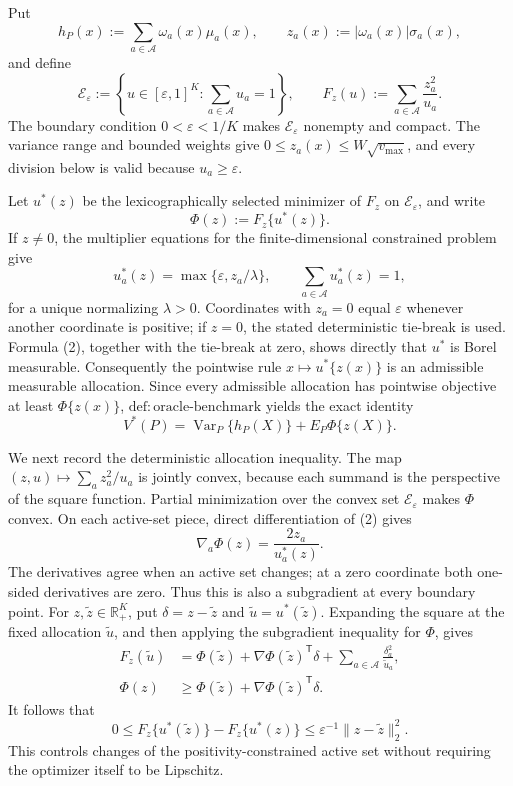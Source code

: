Put
\[
h_P(x):=\sum_{a\in\mathcal A}\omega_a(x)\mu_a(x),
\qquad
z_a(x):=|\omega_a(x)|\sigma_a(x),
\]
and define
\[
\mathcal E_{\varepsilon}:=
\left\{u\in[\varepsilon,1]^K:\sum_{a\in\mathcal A}u_a=1\right\},
\qquad
F_z(u):=\sum_{a\in\mathcal A}\frac{z_a^2}{u_a}.
\tag{1}
\]
The boundary condition \(0<\varepsilon<1/K\) makes \(\mathcal E_{\varepsilon}\) nonempty and compact.  The variance range and bounded weights give
\(0\leq z_a(x)\leq W\sqrt{v_{\max}}\), and every division below is valid because \(u_a\geq\varepsilon\).

Let \(u^*(z)\) be the lexicographically selected minimizer of \(F_z\) on \(\mathcal E_{\varepsilon}\), and write
\[
\Phi(z):=F_z\{u^*(z)\}.
\]
If \(z\neq0\), the multiplier equations for the finite-dimensional constrained problem give
\[
u_a^*(z)=\max\{\varepsilon,z_a/\lambda\},
\qquad
\sum_{a\in\mathcal A}u_a^*(z)=1,
\tag{2}
\]
for a unique normalizing \(\lambda>0\).  Coordinates with \(z_a=0\) equal \(\varepsilon\) whenever another coordinate is positive; if \(z=0\), the stated deterministic tie-break is used.  Formula (2), together with the tie-break at zero, shows directly that \(u^*\) is Borel measurable.  Consequently the pointwise rule \(x\mapsto u^*\{z(x)\}\) is an admissible measurable allocation.  Since every admissible allocation has pointwise objective at least \(\Phi\{z(x)\}\), \(\mathrm{def{:}oracle\text{-}benchmark}\) yields the exact identity
\[
V^*(P)=\operatorname{Var}_P\{h_P(X)\}
+E_P\Phi\{z(X)\}.
\tag{3}
\]

We next record the deterministic allocation inequality.  The map
\((z,u)\mapsto\sum_a z_a^2/u_a\) is jointly convex, because each summand is the perspective of the square function.  Partial minimization over the convex set \(\mathcal E_{\varepsilon}\) makes \(\Phi\) convex.  On each active-set piece, direct differentiation of (2) gives
\[
\nabla_a\Phi(z)=\frac{2z_a}{u_a^*(z)}.
\]
The derivatives agree when an active set changes; at a zero coordinate both one-sided derivatives are zero.  Thus this is also a subgradient at every boundary point.  For \(z,\widetilde z\in\mathbb R_+^K\), put \(\delta=z-\widetilde z\) and \(\widetilde u=u^*(\widetilde z)\).  Expanding the square at the fixed allocation \(\widetilde u\), and then applying the subgradient inequality for \(\Phi\), gives
\[
\begin{aligned}
F_z(\widetilde u)
&=\Phi(\widetilde z)+\nabla\Phi(\widetilde z)^{\mathsf T}\delta
+\sum_{a\in\mathcal A}\frac{\delta_a^2}{\widetilde u_a},\\
\Phi(z)&\geq
\Phi(\widetilde z)+\nabla\Phi(\widetilde z)^{\mathsf T}\delta.
\end{aligned}
\]
It follows that
\[
0\leq F_z\{u^*(\widetilde z)\}-F_z\{u^*(z)\}
\leq\varepsilon^{-1}\|z-\widetilde z\|_2^2.
\tag{4}
\]
This controls changes of the positivity-constrained active set without requiring the optimizer itself to be Lipschitz.

